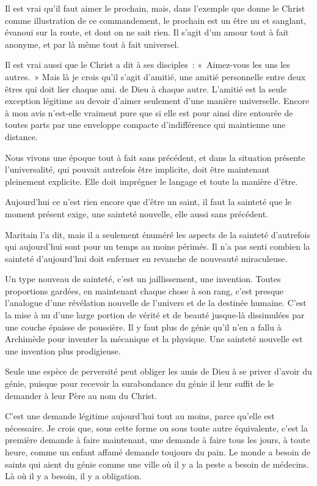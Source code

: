 \documentclass[french,twoside]{book} %
\begin{document}
Il est vrai qu'il faut aimer le prochain, mais, dans l'exemple que donne le Christ comme illustration de ce commandement, le prochain est un être nu et sanglant, évanoui sur la route, et dont on ne sait rien. Il s'agit d'un amour tout à fait anonyme, et par là même tout à fait universel.\par
Il est vrai aussi que le Christ a dit à ses disciples : « Aimez-vous les uns les autres. » Mais là je crois qu'il s'agit d'amitié, une amitié personnelle entre deux êtres qui doit lier chaque ami. de Dieu à chaque autre. L'amitié est la seule exception légitime au devoir d'aimer seulement d'une manière universelle. Encore à mon avis n'est-elle vraiment pure que si elle est pour ainsi dire entourée de toutes parts par une enveloppe compacte d'indifférence qui maintienne une distance.\par
Nous vivons une époque tout à fait sans précédent, et dans la situation présente l'universalité, qui pouvait autrefois être implicite, doit être maintenant pleinement explicite. Elle doit imprégner le langage et toute la manière d'être.\par
Aujourd'hui ce n'est rien encore que d'être un saint, il faut la sainteté que le moment présent exige, une sainteté nouvelle, elle aussi sans précédent.\par
Maritain l'a dit, mais il a seulement énuméré les aspects de la sainteté d'autrefois qui aujourd'hui sont pour un temps au moins périmés. Il n'a pas senti combien la sainteté d'aujourd'hui doit enfermer en revanche de nouveauté miraculeuse.\par
Un type nouveau de sainteté, c'est un jaillissement, une invention. Toutes proportions gardées, en maintenant chaque chose à son rang, c'est presque l'analogue d'une révélation nouvelle de l'univers et de la destinée humaine. C'est la mise à nu d'une large portion de vérité et de beauté jusque-là dissimulées par une couche épaisse de poussière. Il y faut plus de génie qu'il n'en a fallu à Archimède pour inventer la mécanique et la physique. Une sainteté nouvelle est une invention plus prodigieuse.\par
Seule une espèce de perversité peut obliger les amis de Dieu à se priver d'avoir du génie, puisque pour recevoir la surabondance du génie il leur suffit de le demander à leur Père au nom du Christ.\par
C'est une demande légitime aujourd'hui tout au moins, parce qu'elle est nécessaire. Je crois que, sous cette forme ou sous toute autre équivalente, c'est la première demande à faire maintenant, une demande à faire tous les jours, à toute heure, comme un enfant affamé demande toujours du pain. Le monde a besoin de saints qui aient du génie comme une ville où il y a la peste a besoin de médecins. Là où il y a besoin, il y a obligation.\par
\end{document}
